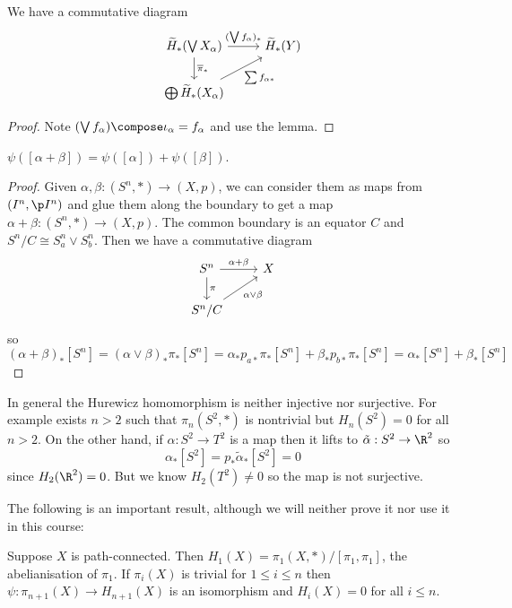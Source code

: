 \documentclass[a4paper]{article}
\renewcommand{\b}{\p}
\begin{document}
\begin{corollary}
  We have a commutative diagram
  \[
    \begin{tikzcd}
      \widetilde H_*(\bigvee X_\alpha) \ar[r, "(\bigvee f_\alpha)_*"] \ar[d, "\overline \pi_*"] & \widetilde H_*(Y) \\
      \bigoplus \widetilde H_*(X_\alpha) \ar[ur, "\sum f_{\alpha *}"']
    \end{tikzcd}
  \]
\end{corollary}

\begin{proof}
  Note \((\bigvee f_\alpha) \compose \iota_\alpha = f_\alpha\) and use the lemma.
\end{proof}


\begin{proposition}
  \(\psi([\alpha + \beta]) = \psi([\alpha]) + \psi([\beta])\).
\end{proposition}

\begin{proof}
  Given \(\alpha, \beta: (S^n, *) \to (X, p)\), we can consider them as maps from \((I^n, \b I^n)\) and glue them along the boundary to get a map \(\alpha + \beta: (S^n, *) \to (X, p)\). The common boundary is an equator \(C\) and \(S^n/C \cong S^n_a \vee S^n_b\). Then we have a commutative diagram
  \[
    \begin{tikzcd}
      S^n \ar[r, "\alpha + \beta"] \ar[d, "\pi"] & X \\
      S^n/C \ar[ur, "\alpha \vee \beta"']
    \end{tikzcd}
  \]
  so
  \[
    (\alpha + \beta)_* [S^n]
    = (\alpha \vee \beta)_* \pi_* [S^n]
    = \alpha_* p_{a*} \pi_* [S^n] + \beta_* p_{b*} \pi_* [S^n]
    = \alpha_* [S^n] + \beta_* [S^n]
  \]
\end{proof}

In general the Hurewicz homomorphism is neither injective nor surjective. For example exists \(n > 2\) such that \(\pi_n(S^2, *)\) is nontrivial but \(H_n(S^2) = 0\) for all \(n > 2\). On the other hand, if \(\alpha: S^2 \to T^2\) is a map then it lifts to \(\tilde \alpha: S^2 \to \R^2\) so
\[
  \alpha_*[S^2] = p_* \tilde \alpha_*[S^2] = 0
\]
since \(H_2(\R^2) = 0\). But we know \(H_2(T^2) \neq 0\) so the map is not surjective.

The following is an important result, although we will neither prove it nor use it in this course:

\begin{theorem}[Hurewicz]
  Suppose \(X\) is path-connected. Then \(H_1(X) = \pi_1(X, *)/[\pi_1, \pi_1]\), the abelianisation of \(\pi_1\). If \(\pi_i(X)\) is trivial for \(1 \leq i \leq n\) then \(\psi: \pi_{n + 1}(X) \to H_{n + 1}(X)\) is an isomorphism and \(H_i(X) = 0\) for all \(i \leq n\).
\end{theorem}
\end{document}
